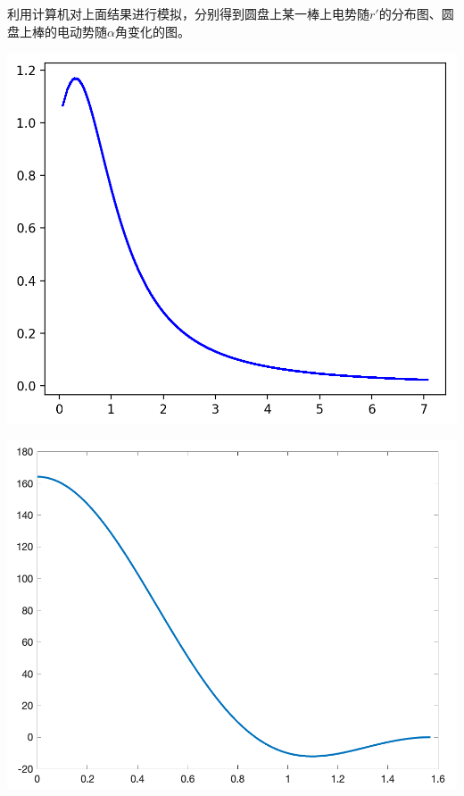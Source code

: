 \documentclass{CLGPY}
\begin{document}
\begin{multicols}{1}
利用计算机对上面结果进行模拟，分别得到圆盘上某一棒上电势随$r'$的分布图、圆盘上棒的电动势随$\alpha$角变化的图。
        \begin{center}
            \includegraphics[scale=.2]{./fig/20210616200434.png}
        \end{center}

        \begin{center}
            \includegraphics[scale=.21]{./fig/20210618231743.png}
        \end{center}


\end{multicols}
\end{document}
